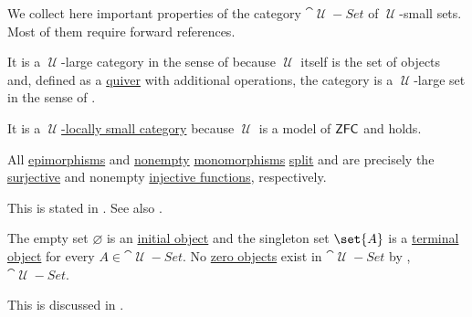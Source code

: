 \begin{proposition}\label{thm:category_of_small_sets_properites}
  We collect here important properties of the category \hyperref[def:category_of_small_sets]{\( \cat{\mscrU-Set} \)} of \( \mscrU \)-small sets. Most of them require forward references.

  \begin{thmenum}
     It is a \( \mscrU \)-large category in the sense of  because \( \mscrU \) itself is the set of objects and, defined as a \hyperref[def:graph/quiver]{quiver} with additional operations, the category is a \( \mscrU \)-large set in the sense of .

     It is a \hyperref[def:category_size]{\( \mscrU \)-locally small category} because \( \mscrU \) is a model of \hyperref[def:zfc]{\( \textsf{ZFC} \)} and  holds.

     All \hyperref[def:morphism_invertibility/right_cancellative]{epimorphisms} and \hyperref[def:multi_valued_function/empty]{nonempty} \hyperref[def:morphism_invertibility/left_cancellative]{monomorphisms} \hyperref[def:morphism_invertibility/left_invertible]{split} and are precisely the \hyperref[def:function_invertibility/surjective]{surjective} and nonempty \hyperref[def:function_invertibility/injective]{injective functions}, respectively.

    This is stated in . See also .

     The empty set \( \varnothing \) is an \hyperref[def:zero_objects/initial]{initial object} and the singleton set \( \set{ A } \) is a \hyperref[def:zero_objects/terminal]{terminal object} for every \( A \in \cat{\mscrU-Set} \). No \hyperref[def:zero_objects/zero]{zero objects} exist in \( \cat{\mscrU-Set} \) by , \( \cat{\mscrU-Set} \).

    This is discussed in .
  \end{thmenum}
\end{proposition}


